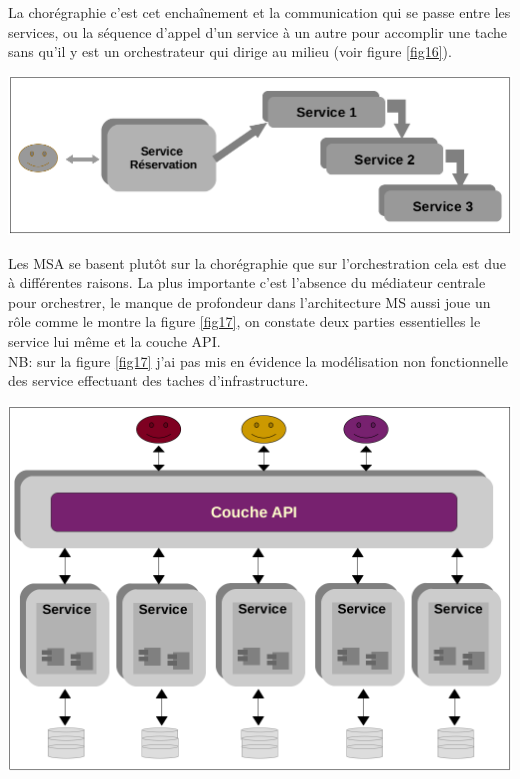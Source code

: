 \documentclass[12pt, a4paper, openany]{report}
\begin{document}
    La chorégraphie c'est cet enchaînement et la communication qui se passe entre les services, ou la séquence d'appel d'un service à un autre pour accomplir une tache sans qu'il y est un orchestrateur qui dirige au milieu (voir figure \ref{fig16}).
    
    \begin{center}
      \includegraphics[scale=0.3]{service_choreg_16.png}
      \label{fig16}
    \end{center}
    
    Les MSA se basent plutôt sur la chorégraphie que sur l'orchestration cela est due à différentes raisons. La plus importante c'est l'absence du médiateur centrale pour orchestrer, le manque de profondeur dans l'architecture MS aussi joue un rôle comme le montre la figure \ref{fig17}, on constate deux parties essentielles le service lui même et la couche API.\\
    
    NB: sur la figure \ref{fig17} j'ai pas mis en évidence la modélisation non fonctionnelle des service effectuant des taches d’infrastructure. \\
    
    \begin{center}
      \includegraphics[scale=0.3]{topologie_msa_17.png}
      \label{fig17}
    \end{center}
    
\end{document}
